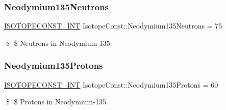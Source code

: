 \subsubsection{\texorpdfstring{Neodymium135\+Neutrons}{Neodymium135Neutrons}}
{\footnotesize\ttfamily \mbox{\hyperlink{group___isotope_const-_macros_ga5f18360b3e99483a35c32d789e62621c}{I\+S\+O\+T\+O\+P\+E\+C\+O\+N\+S\+T\+\_\+\+I\+NT}} Isotope\+Const\+::\+Neodymium135\+Neutrons = 75}

\$ \$ Neutrons in Neodymium-\/135. \mbox{\label{group___isotope_const-_neodymium-_nd135_ga3185a53690541f24d74b276cc5fc4f69}} 
\subsubsection{\texorpdfstring{Neodymium135\+Protons}{Neodymium135Protons}}
{\footnotesize\ttfamily \mbox{\hyperlink{group___isotope_const-_macros_ga5f18360b3e99483a35c32d789e62621c}{I\+S\+O\+T\+O\+P\+E\+C\+O\+N\+S\+T\+\_\+\+I\+NT}} Isotope\+Const\+::\+Neodymium135\+Protons = 60}

\$ \$ Protons in Neodymium-\/135. 